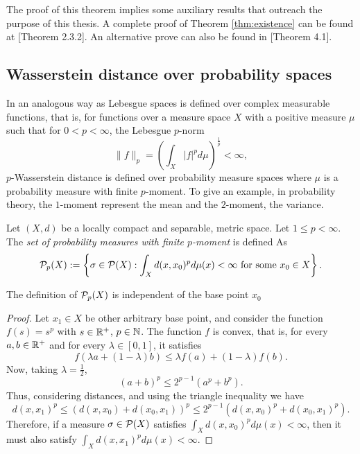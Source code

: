 The proof of this theorem implies some auxiliary results that outreach the purpose of this thesis. A complete proof of Theorem \ref{thm:existence} can be found at \cite{Figalli}[Theorem 2.3.2]. An alternative prove can also be found in \cite{Villani}[Theorem 4.1].

\subsection{Wasserstein distance over probability spaces} \label{sec:wp-probability}

In an analogous way as Lebesgue spaces is defined over complex measurable functions, that is, for functions over a measure space $ X $ with a positive measure $ \mu $ such that for $ 0 < p < \infty $, the Lebesgue $p$-norm
$$
    \|f\|_p = \left(\int_X |f|^p d \mu\right)^{\frac{1}{p}} < \infty,
$$
$p$-Wasserstein distance is defined over probability measure spaces where $ \mu $ is a probability measure with finite $p$-moment. To give an example, in probability theory, the $1$-moment represent the mean and the $2$-moment, the variance.

\begin{definition}
    Let $ (X, d) $ be a locally compact and separable, metric space. Let $ 1 \leq p < \infty $. The {\it set of probability measures with finite $p$-moment} is defined As
    $$
        \mathcal P_p (X) := \left\{ \sigma \in \mathcal P (X) : \int_X d(x, x_0)^p d \mu (x) < \infty \text{ for some } x_0 \in X \right\}.
    $$
\end{definition}

\begin{proposition}
    The definition of $ \mathcal P_p (X) $ is independent of the base point $ x_0 $
\end{proposition}
\begin{proof}
    Let $ x_1 \in X $ be other arbitrary base point, and consider the function $ f(s) = s^p $ with $ s \in \mathbb R^+ $, $p \in \mathbb N $. The function $ f $ is convex, that is, for every $ a, b \in \mathbb R^+ $ and for every $ \lambda \in [0, 1] $, it satisfies
    $$
        f(\lambda a + (1- \lambda)b) \leq \lambda f(a) + (1- \lambda) f(b).
    $$
    Now, taking $ \lambda = \frac{1}{2} $,
    $$
        (a + b)^p \leq 2^{p-1} (a^p + b^p).
    $$
    Thus, considering distances, and using the triangle inequality we have
    $$
        d(x, x_1)^p \leq (d(x, x_0) + d(x_0, x_1))^p \leq 2^{p-1} (d(x, x_0)^p + d(x_0, x_1)^p).
    $$
    Therefore, if a measure $ \sigma \in  \mathcal P (X) $ satisfies $ \int_X d(x, x_0)^p d \mu (x) < \infty $, then it must also satisfy $ \int_X d(x, x_1)^p d \mu (x) < \infty $.
\end{proof}

